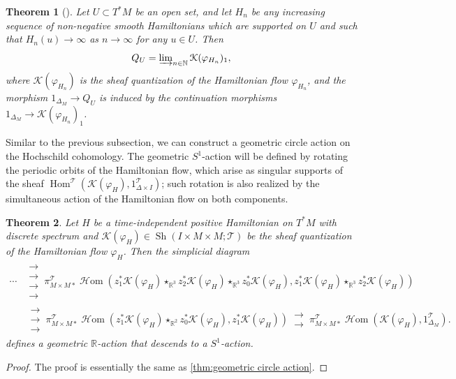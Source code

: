 \documentclass[11pt]{amsart}
\numberwithin{equation}{section}
\theoremstyle{plain}
\newtheorem{Thm}{Theorem}[section]
\theoremstyle{definition}
\theoremstyle{remark}
\newcommand{\bR} { {\mathbb{R}}}
\newcommand{\bN} { {\mathbb{N}}}
\newcommand{\cK} { {\mathcal{K}}}
\newcommand{\sT} { {\mathscr{T}}}
\newcommand{\Sh} { {\operatorname{Sh}}}
\newcommand\Hom{\operatorname{Hom}}
\newcommand\sHom{\operatorname{\mathscr{H}om}}
\begin{document}
\begin{Thm}[{\cite[Corollary 6.6]{Hochschild-Kuo-Shende-Zhang}}]\label{theorem: wrapping formula Tamarkin Q}
Let $U \subset T^*M$ be an open set, and let $H_n$ be any increasing sequence of non-negative smooth Hamiltonians which are supported on $U$ and such that $H_n(u) \to \infty$ as $n \to \infty$ for any $u \in U$. Then
\begin{equation}
    Q_U = \varinjlim\nolimits_{n\in \bN}\cK(\varphi_{H_n})_1,
\end{equation}
where $\cK(\varphi_{H_n})$ is the sheaf quantization of the Hamiltonian flow $\varphi_{H_n}$, and the morphism $1_{\Delta_M} \to Q_U$ is induced by the continuation morphisms $1_{\Delta_M} \to \cK(\varphi_{H_n})_1$.
\end{Thm}

Similar to the previous subsection, we can construct a geometric circle action on the Hochschild cohomology. The geometric $S^1$-action will be defined by rotating the periodic orbits of the Hamiltonian flow, which arise as singular supports of the sheaf $\Hom^\sT(\cK(\varphi_H), 1_{\Delta \times I}^\sT)$; such rotation is also realized by the simultaneous action of the Hamiltonian flow on both components. 

\begin{Thm}\label{thm:geometric circle action tamarkin}
Let $H$ be a time-independent positive Hamiltonian on $T^*M$ with discrete spectrum and $\cK(\varphi_H) \in \Sh(I \times M \times M; \sT)$ be the sheaf quantization of the Hamiltonian flow $\varphi_H$. Then the simplicial diagram
\begin{align*}
\cdots & \substack{\longrightarrow \\[-0.8em] \longrightarrow \\[-0.8em] \longrightarrow \\[-0.8em] \longrightarrow}\, \pi_{M\times M*}^\sT\sHom(z_1^*\cK(\varphi_H) \star_{\bR^3} z_2^*\cK(\varphi_H) \star_{\bR^3} z_0^*\cK(\varphi_H), z_1^*\cK(\varphi_H) \star_{\bR^3} z_2^*\cK(\varphi_H)) \\
&\,\substack{\longrightarrow \\[-0.8em] \longrightarrow \\[-0.8em] \longrightarrow}\, \pi_{M\times M*}^\sT\sHom(z_1^*\cK(\varphi_H) \star_{\bR^2} z_0^*\cK(\varphi_H), z_1^*\cK(\varphi_H)) \,\substack{\longrightarrow \\[-0.8em] \longrightarrow}\, \pi_{M\times M*}^\sT\sHom(\cK(\varphi_H), 1_{\Delta_M}^\sT).
\end{align*}
defines a geometric $\bR$-action that descends to a $S^1$-action.
\end{Thm}
\begin{proof}
The proof is essentially the same as \autoref{thm:geometric circle action}.
\end{proof}
\end{document}
